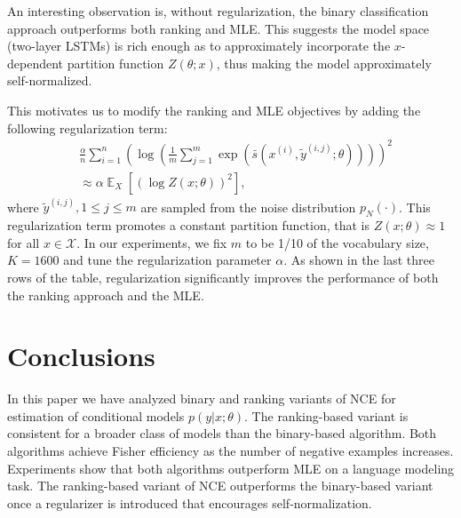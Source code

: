 \documentclass[11pt,a4paper]{article}
\DeclareMathOperator{\E}{\mathbb{E}}
\newcommand{\wt}[1]{\widetilde{#1}}
\newcommand{\ssf}[3]{\bar{s}(#1, #2; #3)}
\newcommand{\commentout}[1]{}
\begin{document}
An interesting observation is, without regularization, the binary classification approach
outperforms both ranking and MLE. This suggests the model space (two-layer LSTMs) is rich enough as to approximately incorporate the $x$-dependent partition function $Z(\theta; x)$, thus making the model approximately self-normalized.
\commentout{
Based on the theory in this paper, the success of the binary approach might indicate the
conditional distribution is approximately self-normalized.
When the intrinsic dimension of ${\cal X}$ is much smaller than its ambient dimension or the model complexity of the scoring function is large (e.g. neural networks), self-normalization could hold approximately, in which case the binary approach covers the true model with a smaller model space and hence could achieve better finite-sample performance. }
This motivates us to modify the ranking
and MLE objectives by adding the following regularization term:
\begin{equation*}
\begin{aligned}
& \frac{\alpha}{n} \sum_{i=1}^n \left( \log \left( \frac{1}{m} \sum_{j=1}^{m} \exp \left( \ssf{x^{(i)}}{\wt{y}^{(i, j)}}{\theta} \right) \right) \right)^2  \\
& \approx \alpha \E_X \left[\left(\log Z(x; \theta) \right)^2\right], 
\end{aligned}
\end{equation*}
where $\wt{y}^{(i, j)}, 1\leq j\leq m$ are sampled from the noise distribution $p_N(\cdot)$. This regularization term promotes a constant partition
function, that is $Z(x; \theta)\approx 1$ for all $x\in\mathcal{X}$.
In our experiments, we fix $m$ to be 1/10 of the vocabulary size, $K =
1600$ and tune the regularization parameter $\alpha$.  As shown in the last three rows of the table,
regularization significantly improves the performance of both the ranking
approach and the MLE. 
 


\section{Conclusions}
In this paper we have analyzed binary and ranking variants of NCE for estimation of conditional models $p(y | x; \theta)$. The ranking-based variant is consistent for a broader class of models than the binary-based algorithm. Both algorithms achieve Fisher efficiency as the number of negative examples increases. 
Experiments show that both algorithms outperform MLE on a language modeling task.  
The ranking-based variant of NCE outperforms the binary-based variant once a regularizer is introduced that encourages self-normalization.
\end{document}
